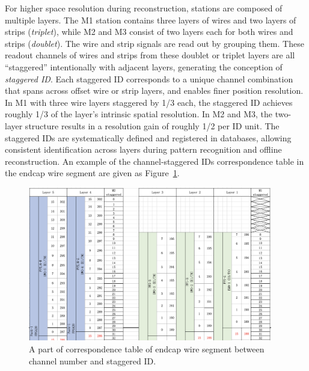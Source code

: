 For higher space resolution during reconstruction, stations are composed of multiple layers. The M1 station contains three layers of wires and two layers of strips (\textit{triplet}), while M2 and M3 consist of two layers each for both wires and strips (\textit{doublet}). The wire and strip signals are read out by grouping them. These readout channels of wires and strips from these doublet or triplet layers are all ``staggered'' intentionally with adjacent layers, generating the conception of \textit{staggered ID}. Each staggered ID corresponds to a unique channel combination that spans across offset wire or strip layers, and enables finer position resolution. In M1 with three wire layers staggered by 1/3 each, the staggered ID achieves roughly 1/3 of the layer's intrinsic spatial resolution. In M2 and M3, the two-layer structure results in a resolution gain of roughly 1/2 per ID unit. The staggered IDs are systematically defined and registered in databases, allowing consistent identification across layers during pattern recognition and offline reconstruction. An example of the channel-staggered IDs correspondence table in the endcap wire segment are given as Figure~\ref{fig:staggeredID}.

\begin{figure}[htbp]
  \centering
  \includegraphics[width=0.95\textwidth]{figs/chapter2/staggeredID_small.png}
  \caption{A part of correspondence table of endcap wire segment between channel number and staggered ID.}
  \label{fig:staggeredID}
\end{figure}


